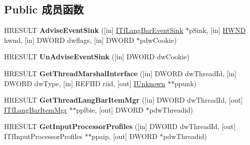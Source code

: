 \subsection*{Public 成员函数}
\begin{DoxyCompactItemize}
\item 
\mbox{\label{interface_i_tf_lang_bar_mgr_aab30db7e3e51cb44280e5a1606dc810e}} 
H\+R\+E\+S\+U\+LT {\bfseries Advise\+Event\+Sink} (\mbox{[}in\mbox{]} \hyperlink{interface_i_tf_lang_bar_event_sink}{I\+Tf\+Lang\+Bar\+Event\+Sink} $\ast$p\+Sink, \mbox{[}in\mbox{]} \hyperlink{interfacevoid}{H\+W\+ND} hwnd, \mbox{[}in\mbox{]} D\+W\+O\+RD dwflags, \mbox{[}in\mbox{]} D\+W\+O\+RD $\ast$pdw\+Cookie)
\item 
\mbox{\label{interface_i_tf_lang_bar_mgr_a720f5824aa72dcb23f0c48e9382070f0}} 
H\+R\+E\+S\+U\+LT {\bfseries Un\+Advise\+Event\+Sink} (\mbox{[}in\mbox{]} D\+W\+O\+RD dw\+Cookie)
\item 
\mbox{\label{interface_i_tf_lang_bar_mgr_a1d53b5568e28f4d12afe5a7f9db04bfd}} 
H\+R\+E\+S\+U\+LT {\bfseries Get\+Thread\+Marshal\+Interface} (\mbox{[}in\mbox{]} D\+W\+O\+RD dw\+Thread\+Id, \mbox{[}in\mbox{]} D\+W\+O\+RD dw\+Type, \mbox{[}in\mbox{]} R\+E\+F\+I\+ID riid, \mbox{[}out\mbox{]} \hyperlink{interface_i_unknown}{I\+Unknown} $\ast$$\ast$ppunk)
\item 
\mbox{\label{interface_i_tf_lang_bar_mgr_a61bf19be2c7a352bb494674ad3877c5a}} 
H\+R\+E\+S\+U\+LT {\bfseries Get\+Thread\+Lang\+Bar\+Item\+Mgr} (\mbox{[}in\mbox{]} D\+W\+O\+RD dw\+Thread\+Id, \mbox{[}out\mbox{]} \hyperlink{interface_i_tf_lang_bar_item_mgr}{I\+Tf\+Lang\+Bar\+Item\+Mgr} $\ast$$\ast$pplbie, \mbox{[}out\mbox{]} D\+W\+O\+RD $\ast$pdw\+Threadid)
\item 
\mbox{\label{interface_i_tf_lang_bar_mgr_ad4ce57d93521a4f1be1030ac7ff35415}} 
H\+R\+E\+S\+U\+LT {\bfseries Get\+Input\+Processor\+Profiles} (\mbox{[}in\mbox{]} D\+W\+O\+RD dw\+Thread\+Id, \mbox{[}out\mbox{]} I\+Tf\+Input\+Processor\+Profiles $\ast$$\ast$ppaip, \mbox{[}out\mbox{]} D\+W\+O\+RD $\ast$pdw\+Threadid)
\item 
\mbox{\label{interface_i_tf_lang_bar_mgr_a2882d33aac9623586c02b217eb096856}} 
$$
\end{DoxyCompactItemize}
